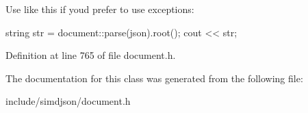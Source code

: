 Use like this if you\textquotesingle{}d prefer to use exceptions\+: \begin{DoxyVerb}string str = document::parse(json).root();
cout << str;\end{DoxyVerb}
 

Definition at line 765 of file document.\+h.



The documentation for this class was generated from the following file\+:\begin{DoxyCompactItemize}
\item 
include/simdjson/document.\+h\end{DoxyCompactItemize}
